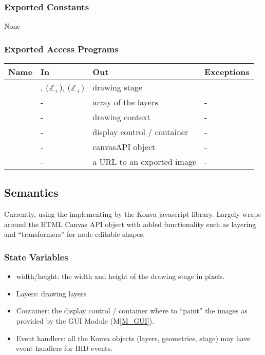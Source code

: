\documentclass[12pt, titlepage]{article}
\newcommand{\mref}[1]{M\ref{#1}}
\newcommand{\mrefp}[1]{(\mref{#1})}
\newcommand{\mreff}[1]{Module \mrefp{#1}}
\begin{document}
\subsubsection{Exported Constants}
None

\subsubsection{Exported Access Programs}

\begin{center}
\begin{tabular}{L{3cm} L{4cm} L{4cm} L{4cm}}
\hline
\textbf{Name} & \textbf{In} & \textbf{Out} & \textbf{Exceptions} \\
\hline
{} & ,  ($\mathbb{Z}_+$),  ($\mathbb{Z}_+$)
  & drawing stage &  \\
\hline
{} & - & array of the layers & - \\
\hline
{} & - & drawing context \cite{html_std_canvas} & - \\
\hline
{} & - & display control / container & - \\
\hline
{} & - & canvasAPI object \cite{html_std_canvas} & - \\
\hline
{} & - & a URL to an exported image \cite{html_std_canvas} & - \\
\hline
\end{tabular}
\end{center}

\subsection{Semantics}
Currently, using the implementing by the Konva \cite{konva_2021} javascript library.
Largely wraps around the HTML Canvas API object with added functionality such as layering
and ``transformers'' for node-editable shapes.

\subsubsection{State Variables}
\begin{itemize}
  \item width/height: the width and height of the drawing stage in pixels.
  \item Layers: drawing layers
  \item Container: the display control / container where to ``paint'' the images
    as provided by the GUI \mreff{M_GUI}.
  \item Event handlers: all the Konva objects (layers, geometries, stage) may
    have event handlers for HID events.
\end{itemize}
\end{document}
